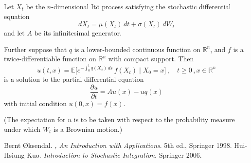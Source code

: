 \documentclass[12pt]{article}
\newcommand{\real}{\mathbb{R}}
\providecommand{\pd}[2]{\frac{\partial #1}{\partial #2}}
\newcommand{\E}{\mathbb{E}}
\begin{document}
Let $X_t$ be the $n$-dimensional It\=o process satisfying the 
stochastic differential
equation
\[
dX_t = \mu(X_t) \, dt + \sigma(X_t) \, dW_t
\]
and let $A$ be its infinitesimal generator.

Further suppose that $q$ is a lower-bounded continuous function on 
$\real^n$, and $f$ is a twice-differentiable
function on $\real^n$ with compact support.
Then
\[
u(t,x) = \E\bigl[ e^{-\int_0^t q(X_s) \, ds} \, f(X_t) \mid X_0 = x \bigr]\,,
\quad t\geq 0\,, x \in \real^n
\]
is a solution to the partial differential equation
\[
\pd{u}{t} = Au(x) - uq(x)
\]
with initial condition $u(0, x) = f(x)$.

(The expectation for $u$ is to be taken with respect
to the probability measure under which $W_t$ is a Brownian motion.)

\begin{thebibliography}{9}
Bernt \O{}ksendal.
{\em {},
An Introduction with Applications}. 5th ed., Springer 1998.
Hui-Hsiung Kuo. {\em Introduction to Stochastic Integration}.
Springer 2006.
\end{thebibliography}
\end{document}
